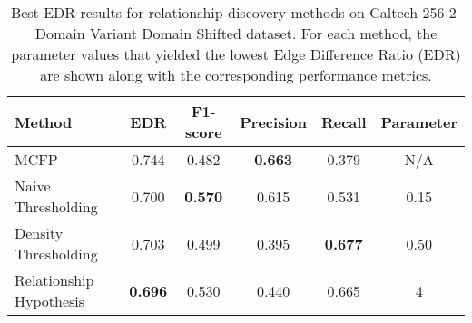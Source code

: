 \begin{table}[ht]
\centering
\caption{Best EDR results for relationship discovery methods on Caltech-256 2-Domain Variant Domain Shifted dataset. For each method, the parameter values that yielded the lowest Edge Difference Ratio (EDR) are shown along with the corresponding performance metrics.}
\label{tab:relationship_methods_domain_shifted_results}
\begin{tabular}{lccccc}
\toprule
Method & EDR & F1-score & Precision & Recall & Parameter \\
\midrule
MCFP & 0.744 & 0.482 & \textbf{0.663} & 0.379 & N/A \\
Naive Thresholding & 0.700 & \textbf{0.570} & 0.615 & 0.531 & 0.15 \\
Density Thresholding & 0.703 & 0.499 & 0.395 & \textbf{0.677} & 0.50 \\
Relationship Hypothesis & \textbf{0.696} & 0.530 & 0.440 & 0.665 & 4 \\
\bottomrule
\end{tabular}
\end{table}
